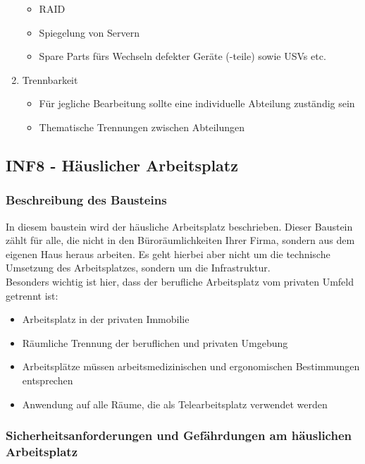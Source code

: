 \documentclass[a4paper, 12pt]{report}
\begin{document}
\begin{multicols}{2}
\begin{enumerate}
\begin{itemize}
			\item RAID
			\item Spiegelung von Servern
			\item Spare Parts fürs Wechseln defekter Geräte (-teile)
				sowie USVs etc.
		\end{itemize}
	\item Trennbarkeit
		\begin{itemize}
			\item Für jegliche Bearbeitung sollte eine individuelle
				Abteilung zuständig sein
			\item Thematische Trennungen zwischen Abteilungen
		\end{itemize}
\end{enumerate}

\subsection{INF8 - Häuslicher Arbeitsplatz}

\subsubsection{Beschreibung des Bausteins}

In diesem baustein wird der häusliche Arbeitsplatz beschrieben. Dieser Baustein 
zählt für alle, die nicht in den Büroräumlichkeiten Ihrer Firma, sondern aus dem
eigenen Haus heraus arbeiten. Es geht hierbei aber nicht um die technische 
Umsetzung des Arbeitsplatzes, sondern um die Infrastruktur. \\

Besonders wichtig ist hier, dass der berufliche Arbeitsplatz vom privaten Umfeld
getrennt ist: 

\begin{itemize}
	\item Arbeitsplatz in der privaten Immobilie
	\item Räumliche Trennung der beruflichen und privaten Umgebung
	\item Arbeitsplätze müssen arbeitsmedizinischen und ergonomischen 
		Bestimmungen entsprechen
	\item Anwendung auf alle Räume, die als Telearbeitsplatz verwendet 
		werden
\end{itemize}

\subsubsection{Sicherheitsanforderungen und Gefährdungen am häuslichen 
Arbeitsplatz}


\end{multicols}
\end{document}
